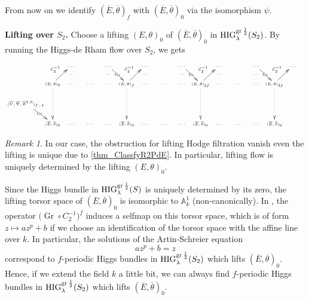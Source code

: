 \documentclass[12pt,twoside]{book}
\theoremstyle{plain}
\theoremstyle{definition}
\theoremstyle{remark}
\newtheorem{remark}[remark]{Remark}
\newcommand{\bA}{{\mathbb A}}
\newcommand{\mC}{{\mathcal C}}
\DeclareMathOperator\Gr{Gr}
\numberwithin{equation}{section}
\def\High{{\mathrm{HIG}^{{\rm gr}\,{1\over 2}}_{\lambda}}}
\begin{document}
From now on we identify $(\overline E,\overline\theta)_{f}$ with $(\overline E,\overline\theta)_{0}$ via the isomorphism $\psi$.

\textbf{Lifting over $S_2$.} Choose a lifting $(E,\theta)_0$ of $(\overline{E},\overline{\theta})_0$ in $\High(S_2)$. By running the Higgs-de Rham flow over $S_2$, we gets
\begin{equation*}\tiny
\xymatrix@W=10mm@C=-3mm@R=5mm{
&& \cdots \ar@{}[d]|\cdots && \cdots \ar@{}[d]|\cdots \ar[dr]|{\Gr}
&& \cdots \ar@{}[d]|\cdots && \cdots \ar@{}[d]|\cdots \ar[dr]|{\Gr}
&& \cdots \ar@{}[d]|\cdots && \cdots \ar@{}[d]|\cdots \ar[dr]|{\Gr}
&& \cdots
\\
& (E,\theta)_{0} \ar[ur]^{\mC^{-1}_2} \ar@{..>}[dd]
&\cdots&\cdots& \cdots & (E,\theta)_{f} \ar[ur]^{\mC^{-1}_2} \ar@{..>}[dd] &\cdots&\cdots& \cdots & (E,\theta)_{2f} \ar[ur]^{\mC^{-1}_2} \ar@{..>}[dd] &\cdots&\cdots& \cdots & (E,\theta)_{3f} \ar[ur]^{\mC^{-1}_2} \ar@{..>}[dd]
\\
(\overline V,\overline\nabla,\overline E^{1,0})_{f-1} \ar[dr]|{\Gr}
&\\
&(\overline{E},\overline{\theta})_0
&\cdots&\cdots&\cdots&(\overline{E},\overline{\theta})_0
&\cdots&\cdots&\cdots&(\overline{E},\overline{\theta})_0
&\cdots&\cdots&\cdots&(\overline{E},\overline{\theta})_0 \\
}
\end{equation*}
\begin{remark}
In our case, the obstruction for lifting Hodge filtration vanish even the lifting is unique due to \autoref{thm_ClassfyR2PdE}. In particular, lifting flow is uniquely determined by the lifting $(E,\theta)_0$.
\end{remark}

Since the Higgs bundle in $\High(S)$ is uniquely determined by its zero, the lifting torsor space of $(\overline{E},\overline{\theta})_0$ is isomorphic to $\bA^1_k$ (non-canonically). In \cite{KYZ20D}, the operator $\Big(\Gr\circ C_2^{-1}\Big)^f$ induces a selfmap on this torsor space, which is of form $z\mapsto az^p+b$ if we choose an identification of the torsor space with the affine line over $k$. In particular, the solutions of the Artin-Schreier equation
\begin{equation} \label{equ:ArtinSchreier}
az^p+b = z
\end{equation}
correspond to $f$-periodic Higgs bundles in $\High(S_2)$ which lifts $(\overline E,\overline\theta)_{0}$.
Hence, if we extend the field $k$ a little bit, we can always find $f$-periodic Higgs bundles in $\High(S_2)$ which lifts $(\overline E,\overline\theta)_{0}$.
\end{document}
